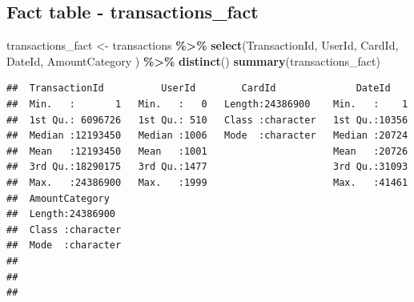 \documentclass[
]{article}
\newenvironment{Shaded}{\begin{snugshade}}{\end{snugshade}}
\newcommand{\FunctionTok}[1]{\textcolor[rgb]{0.13,0.29,0.53}{\textbf{#1}}}
\newcommand{\NormalTok}[1]{#1}
\newcommand{\OtherTok}[1]{\textcolor[rgb]{0.56,0.35,0.01}{#1}}
\newcommand{\SpecialCharTok}[1]{\textcolor[rgb]{0.81,0.36,0.00}{\textbf{#1}}}
\begin{document}
\subsection{Fact table -
transactions\_fact}\label{fact-table---transactions_fact}

\begin{Shaded}
\begin{Highlighting}[]
\NormalTok{transactions\_fact }\OtherTok{\textless{}{-}}\NormalTok{ transactions }\SpecialCharTok{\%\textgreater{}\%} \FunctionTok{select}\NormalTok{(TransactionId, UserId, CardId, }
\NormalTok{                                             DateId, AmountCategory}
\NormalTok{                                             ) }\SpecialCharTok{\%\textgreater{}\%} \FunctionTok{distinct}\NormalTok{()}
\FunctionTok{summary}\NormalTok{(transactions\_fact)}
\end{Highlighting}
\end{Shaded}

\begin{verbatim}
##  TransactionId          UserId        CardId              DateId     
##  Min.   :       1   Min.   :   0   Length:24386900    Min.   :    1  
##  1st Qu.: 6096726   1st Qu.: 510   Class :character   1st Qu.:10356  
##  Median :12193450   Median :1006   Mode  :character   Median :20724  
##  Mean   :12193450   Mean   :1001                      Mean   :20726  
##  3rd Qu.:18290175   3rd Qu.:1477                      3rd Qu.:31093  
##  Max.   :24386900   Max.   :1999                      Max.   :41461  
##  AmountCategory    
##  Length:24386900   
##  Class :character  
##  Mode  :character  
##                    
##                    
## 
\end{verbatim}
\end{document}
